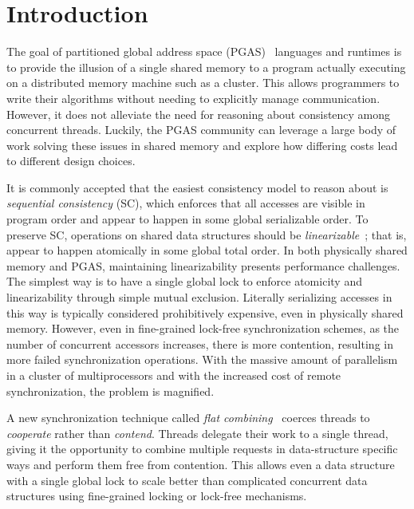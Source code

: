 \section{Introduction}
The goal of partitioned global address space (PGAS)~\cite{upc:2005} languages and runtimes is to provide the illusion of a single shared memory to a program actually executing on a distributed memory machine such as a cluster. This allows programmers to write their algorithms without needing to explicitly manage communication.
However, it does not alleviate the need for reasoning about consistency among concurrent threads.
Luckily, the PGAS community can leverage a large body of work solving these issues in shared memory and explore how differing costs lead to different design choices.

It is commonly accepted that the easiest consistency model to reason about is \emph{sequential consistency} (SC), which enforces that all accesses are visible in program order and appear to happen in some global serializable order.
To preserve SC, operations on shared data structures should be \emph{linearizable}~\cite{herlihy1990linearizability}; that is, appear to happen atomically in some global total order.
In both physically shared memory and PGAS, maintaining linearizability presents performance challenges.
The simplest way is to have a single global lock to enforce atomicity and linearizability through simple mutual exclusion. Literally serializing accesses in this way is typically considered prohibitively expensive, even in physically shared memory.
However, even in fine-grained lock-free synchronization schemes, as the number of concurrent accessors increases, there is more contention, resulting in more failed synchronization operations.
With the massive amount of parallelism in a cluster of multiprocessors and with the increased cost of remote synchronization, the problem is magnified.

A new synchronization technique called \emph{flat combining}~\cite{flatCombining} coerces threads to \emph{cooperate} rather than \emph{contend}.
Threads delegate their work to a single thread, giving it the opportunity to combine multiple requests in data-structure specific ways and perform them free from contention.
This allows even a data structure with a single global lock to scale better than complicated concurrent data structures using fine-grained locking or lock-free mechanisms.

